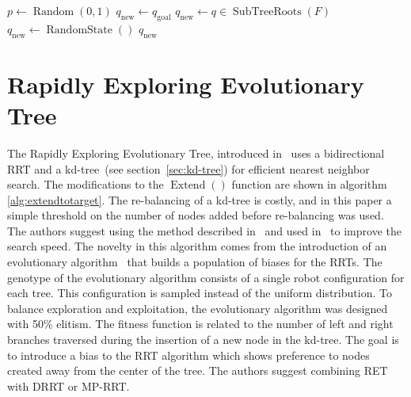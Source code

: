 \begin{algorithm}[ht!]
\caption{$\operatorname{SelectSample}(F)$}
\label{alg:selectsample}
\begin{algorithmic}[1]
    \STATE \(p \leftarrow  \operatorname{Random}(0,1)\)
        \STATE \(q_{\text{new}} \leftarrow q_{\text{goal}}\)
        \STATE \(q_{\text{new}} \leftarrow  q \in \operatorname{SubTreeRoots}(F)\)
    \ELSE
        \STATE \(q_{\text{new}} \leftarrow  \operatorname{RandomState}()\)
    \ENDIF
    \RETURN \(q_{\text{new}}\)
\end{algorithmic}
\end{algorithm}

\section{Rapidly Exploring Evolutionary Tree}
\label{sec:RET}
The Rapidly Exploring Evolutionary Tree, introduced in~\cite{Martin07} uses a
bidirectional RRT and a \mbox{kd-tree}~(see section~\ref{sec:kd-tree}) for efficient
nearest neighbor search. The
modifications to the \(\operatorname{Extend}()\) function are shown in algorithm
\ref{alg:extendtotarget}. The
re-balancing of a \mbox{kd-tree} is costly, and in this paper a simple threshold on the
number of nodes added before re-balancing was used. The authors suggest using the
method described in~\cite{Atramentov02} and used in~\cite{Bruce02} to improve
the search speed. The novelty in this algorithm comes from the introduction of
an evolutionary algorithm~\cite{Back97} that builds a population of biases for the RRTs. The
genotype of the evolutionary algorithm consists of a single robot configuration for each tree. This
configuration is sampled instead of the uniform distribution. To balance
exploration and exploitation, the evolutionary algorithm was designed with 50\% elitism. The fitness
function is related to the number of left and right branches traversed during
the insertion of a new node in the \mbox{kd-tree}. The goal is to introduce a bias to
the RRT algorithm which shows preference to nodes created away from the center
of the tree. The authors suggest combining RET with DRRT or MP-RRT.

